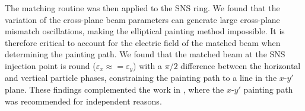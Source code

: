 The matching routine was then applied to the SNS ring. We found that the variation of the cross-plane beam parameters can generate large cross-plane mismatch oscillations, making the elliptical painting method impossible. It is therefore critical to account for the electric field of the matched beam when determining the painting path. We found that the matched beam at the SNS injection point is round ($\varepsilon_x \approx = \varepsilon_y$) with a $\pi / 2$ difference between the horizontal and vertical particle phases, constraining the painting path to a line in the $x$-$y'$ plane. These findings complemented the work in \cite{Holmes2018}, where the $x$-$y'$ painting path was recommended for independent reasons.
